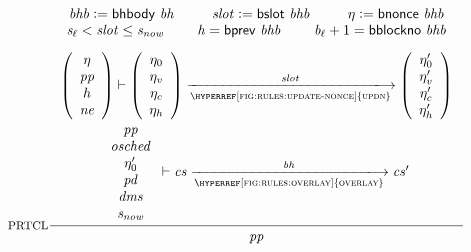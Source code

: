 \begin{figure}[ht]
  \begin{equation}\label{eq:prtcl}
    \inference[PRTCL]
    {
      \var{bhb}\leteq\bhbody{bh}
      &
      \var{slot} \leteq \bslot{bhb}
      &
      \eta\leteq\fun{bnonce}~\var{bhb}
      \\
      \var{s_\ell} < \var{slot} \leq \var{s_{now}}
      &
      \var{h} = \bprev{bhb}
      &
      \var{b_\ell} + 1 = \fun{bblockno}~\var{bhb}
      \\~\\
      {
        {\left(\begin{array}{c}
        \eta \\
        \var{pp} \\
        h \\
        \var{ne} \\
        \end{array}\right)}
        \vdash
        {\left(\begin{array}{c}
        \eta_0 \\
        \eta_v \\
        \eta_c \\
        \eta_h \\
        \end{array}\right)}
        \trans{\hyperref[fig:rules:update-nonce]{updn}}{\var{slot}}
        {\left(\begin{array}{c}
        \eta_0' \\
        \eta_v' \\
        \eta_c' \\
        \eta_h' \\
        \end{array}\right)}
      }\\~\\
      {
        {\begin{array}{c}
          \var{pp} \\
          \var{osched} \\
          \eta_0' \\
          \var{pd} \\
          \var{dms} \\
          \var{s_{now}} \\
        \end{array}
        }
        \vdash \var{cs}\trans{\hyperref[fig:rules:overlay]{overlay}}{\var{bh}} \var{cs}'
      }
    }
    {
      {\begin{array}{c}
         \var{pp} \\

\end{array}}}
\end{equation}
\end{figure}
